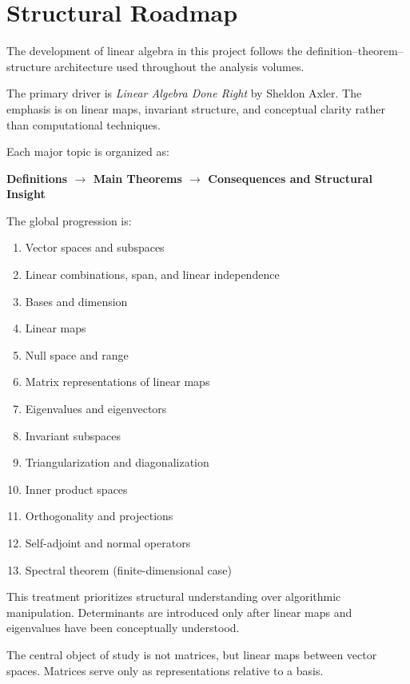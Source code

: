 \section*{Structural Roadmap}

The development of linear algebra in this project follows
the definition--theorem--structure architecture used
throughout the analysis volumes.

The primary driver is \textit{Linear Algebra Done Right}
by Sheldon Axler. The emphasis is on linear maps,
invariant structure, and conceptual clarity
rather than computational techniques.

Each major topic is organized as:
\begin{center}
\textbf{Definitions $\longrightarrow$ Main Theorems $\longrightarrow$ Consequences and Structural Insight}
\end{center}

The global progression is:

\begin{enumerate}
  \item Vector spaces and subspaces
  \item Linear combinations, span, and linear independence
  \item Bases and dimension
  \item Linear maps
  \item Null space and range
  \item Matrix representations of linear maps
  \item Eigenvalues and eigenvectors
  \item Invariant subspaces
  \item Triangularization and diagonalization
  \item Inner product spaces
  \item Orthogonality and projections
  \item Self-adjoint and normal operators
  \item Spectral theorem (finite-dimensional case)
\end{enumerate}

\vspace{1em}

\begin{remark}
This treatment prioritizes structural understanding over
algorithmic manipulation. Determinants are introduced only
after linear maps and eigenvalues have been conceptually
understood.
\end{remark}

\begin{remark}
The central object of study is not matrices,
but linear maps between vector spaces.
Matrices serve only as representations relative to a basis.
\end{remark}

